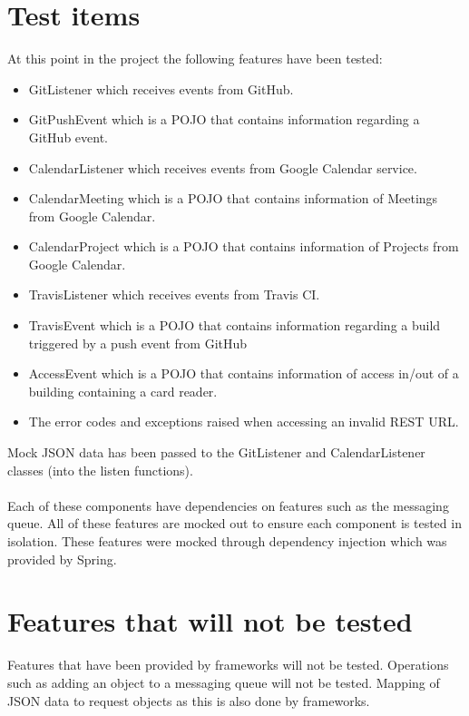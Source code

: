 \documentclass[11pt,a4paper]{article}
\begin{document}
\section{Test items}
At this point in the project the following features have been tested:
\begin{itemize}
	\item GitListener which receives events from GitHub.
	\item GitPushEvent which is a POJO that contains information regarding a GitHub event.
	\item CalendarListener which receives events from Google Calendar service.
	\item CalendarMeeting which is a POJO that contains information of Meetings from Google Calendar.
	\item CalendarProject which is a POJO that contains information of Projects from Google Calendar. 
	\item TravisListener which receives events from Travis CI.
	\item TravisEvent which is a POJO that contains information regarding a build triggered by a push event from GitHub
	\item AccessEvent which is a POJO that contains information of access in/out of a building containing a card reader.
	\item The error codes and exceptions raised when accessing an invalid REST URL.
	 
\end{itemize}

Mock JSON data has been passed to the GitListener and CalendarListener classes (into the listen functions). \\\\
Each of these components have dependencies on features such as the messaging queue. All of these features are mocked out to ensure each component is tested in isolation. These features were mocked through dependency injection which was provided by Spring. \\

\section{Features that will not be tested}

Features that have been provided by frameworks will not be tested. Operations such as adding an object to a messaging queue will not be tested. Mapping of JSON data to request objects as this is also done by frameworks.
\end{document}
